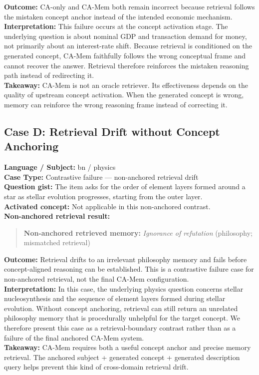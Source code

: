 \documentclass[11pt]{article}
\newcommand{\FloatBarrier}{}
\begin{document}
\noindent\textbf{Outcome:} CA-only and CA-Mem both remain incorrect because retrieval follows the mistaken concept anchor instead of the intended economic mechanism.\\
\textbf{Interpretation:} This failure occurs at the concept activation stage. The underlying question is about nominal GDP and transaction demand for money, not primarily about an interest-rate shift. Because retrieval is conditioned on the generated concept, CA-Mem faithfully follows the wrong conceptual frame and cannot recover the answer. Retrieval therefore reinforces the mistaken reasoning path instead of redirecting it.\\
\textbf{Takeaway:} CA-Mem is not an oracle retriever. Its effectiveness depends on the quality of upstream concept activation. When the generated concept is wrong, memory can reinforce the wrong reasoning frame instead of correcting it.

\subsection{Case D: Retrieval Drift without Concept Anchoring}
\noindent\textbf{Language / Subject:} bn / physics\\
\textbf{Case Type:} Contrastive failure --- non-anchored retrieval drift\\
\textbf{Question gist:} The item asks for the order of element layers formed around a star as stellar evolution progresses, starting from the outer layer.\\
\textbf{Activated concept:} Not applicable in this non-anchored contrast.\\
\textbf{Non-anchored retrieval result:}

\begin{quote}\small
\textbf{Non-anchored retrieved memory:} \textit{Ignorance of refutation} (philosophy; mismatched retrieval)
\end{quote}

\noindent\textbf{Outcome:} Retrieval drifts to an irrelevant philosophy memory and fails before concept-aligned reasoning can be established. This is a contrastive failure case for non-anchored retrieval, not the final CA-Mem configuration.\\
\textbf{Interpretation:} In this case, the underlying physics question concerns stellar nucleosynthesis and the sequence of element layers formed during stellar evolution. Without concept anchoring, retrieval can still return an unrelated philosophy memory that is procedurally unhelpful for the target concept. We therefore present this case as a retrieval-boundary contrast rather than as a failure of the final anchored CA-Mem system.\\
\textbf{Takeaway:} CA-Mem requires both a useful concept anchor and precise memory retrieval. The anchored subject + generated concept + generated description query helps prevent this kind of cross-domain retrieval drift.


\FloatBarrier
\end{document}
